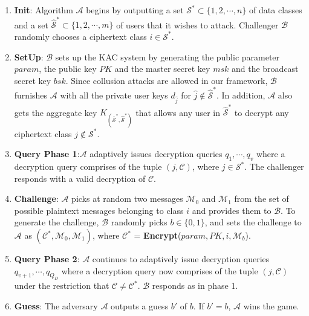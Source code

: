 \begin{enumerate}
 \item \textbf{Init}: Algorithm $\mathcal{A}$ begins by outputting a set ${\mathcal{S}}^{*} \subset \{1,2,\cdots,n\}$ of data classes and a set $\hat{{\mathcal{S}}}^{*} \subset \{1,2,\cdots,m\}$ of users that it wishes to attack. Challenger $\mathcal{B}$ randomly chooses a ciphertext class $i\in{\mathcal{S}}^{*}$.
 
 \item \textbf{SetUp}: $\mathcal{B}$ sets up the KAC system by generating the public parameter $param$, the public key $PK$ and the master secret key $msk$ and the broadcast secret key $bsk$. Since collusion attacks are allowed in our framework, $\mathcal{B}$ furnishes $\mathcal{A}$ with all the private user keys $d_{\hat{j}}$ for $\hat{j}\notin\hat{{\mathcal{S}}}^{*}$. In addition, $\mathcal{A}$ also gets the aggregate key $K_{\left(\overline{\mathcal{S}}^{*},\hat{\mathcal{S}}^{*}\right)}$ that allows any user in $\hat{{\mathcal{S}}}^{*}$ to decrypt any ciphertext class $j\notin{\mathcal{S}}^{*}$. 
 
 \item \textbf{Query Phase 1}:$\mathcal{A}$ adaptively issues decryption queries $q_1,\cdots,q_v$ where a decryption query comprises of the tuple $(j,\mathcal{C})$, where $j\in{\mathcal{S}}^{*}$. The challenger responds with a valid decryption of $\mathcal{C}$.
 
 \item \textbf{Challenge}: $\mathcal{A}$ picks at random two messages $\mathcal{M}_0$ and $\mathcal{M}_1$ from the set of possible plaintext messages belonging to class $i$ and provides them to $\mathcal{B}$. To generate the challenge, $\mathcal{B}$ randomly picks $b\in\{0,1\}$, and sets the challenge to $\mathcal{A}$ as $(\mathcal{C}^{*},\mathcal{M}_0,\mathcal{M}_1)$, where ${\mathcal{C}}^{*}$ = \textbf{Encrypt}($param,PK,i,\mathcal{M}_b$).
 
 \item \textbf{Query Phase 2}: $\mathcal{A}$ continues to adaptively issue decryption queries $q_{v+1},\cdots,q_{Q_D}$ where a decryption query now comprises of the tuple $(j,\mathcal{C})$ under the restriction that $\mathcal{C}\neq {\mathcal{C}}^{*}$. $\mathcal{B}$ responds as in phase 1. 
 
 \item\textbf{Guess}: The adversary $\mathcal{A}$ outputs a guess $b'$ of $b$. If $b' = b$, $\mathcal{A}$ wins the game.
\end{enumerate}

